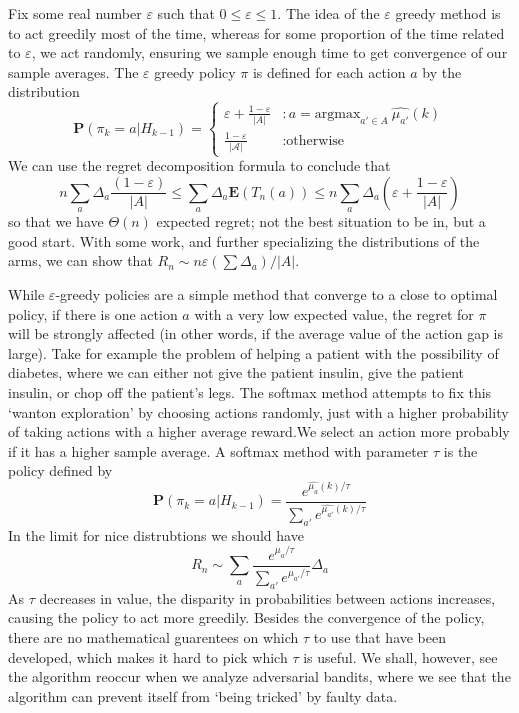 Fix some real number $\varepsilon$ such that $0 \leq \varepsilon \leq 1$. The idea of the $\varepsilon$ greedy method is to act greedily most of the time, whereas for some proportion of the time related to $\varepsilon$, we act randomly, ensuring we sample enough time to get convergence of our sample averages. The $\varepsilon$ greedy policy $\pi$ is defined for each action $a$ by the distribution
%
\[ \mathbf{P}(\pi_k = a | H_{k-1})  =
        \begin{cases} \varepsilon + \frac{1 - \varepsilon}{|A|} &: a = \text{argmax}_{a' \in A}\ \widehat{\mu_{a'}}(k)\\
        \frac{1 - \varepsilon}{|\mathcal{A}|} &: \text{otherwise}
        \end{cases} \]
%
We can use the regret decomposition formula to conclude that
%
\[ n \sum_a \Delta_a \frac{(1 - \varepsilon)}{|A|} \leq \sum_a \Delta_a \mathbf{E}(T_n(a)) \leq n \sum_a \Delta_a \left( \varepsilon + \frac{1 - \varepsilon}{|A|} \right) \]
%
so that we have $\Theta(n)$ expected regret; not the best situation to be in, but a good start. With some work, and further specializing the distributions of the arms, we can show that $R_n \sim n \varepsilon (\sum \Delta_a)/|A|$.

While $\varepsilon$-greedy policies are a simple method that converge to a close to optimal policy, if there is one action $a$ with a very low expected value, the regret for $\pi$ will be strongly affected (in other words, if the average value of the action gap is large). Take for example the problem of helping a patient with the possibility of diabetes, where we can either not give the patient insulin, give the patient insulin, or chop off the patient's legs. The softmax method attempts to fix this `wanton exploration' by choosing actions randomly, just with a higher probability of taking actions with a higher average reward.We select an action more probably if it has a higher sample average. A softmax method with parameter $\tau$ is the policy defined by
%
\[ \mathbf{P}(\pi_k = a | H_{k-1}) = \frac{e^{\widehat{\mu_a}(k)/\tau}}{\sum_{a'} e^{\widehat{\mu_{a'}}(k)/\tau}}\]
% 
In the limit for nice distrubtions we should have
%
\[ R_n \sim \sum_a \frac{e^{\mu_a/\tau}}{\sum_{a'} e^{\mu_{a'}/\tau}} \Delta_a \]
%
As $\tau$ decreases in value, the disparity in probabilities between actions increases, causing the policy to act more greedily. Besides the convergence of the policy, there are no mathematical guarentees on which $\tau$ to use that have been developed, which makes it hard to pick which $\tau$ is useful. We shall, however, see the algorithm reoccur when we analyze adversarial bandits, where we see that the algorithm can prevent itself from `being tricked' by faulty data.

